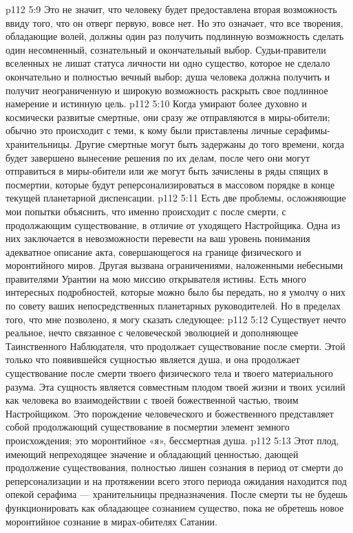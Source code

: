 \vs p112 5:9 Это не значит, что человеку будет предоставлена вторая возможность ввиду того, что он отверг первую, вовсе нет. Но это означает, что все творения, обладающие волей, должны один раз получить подлинную возможность сделать один несомненный, сознательный и окончательный выбор. Судьи\hyp{}правители вселенных не лишат статуса личности ни одно существо, которое не сделало окончательно и полностью вечный выбор; душа человека должна получить и получит неограниченную и широкую возможность раскрыть свое подлинное намерение и истинную цель.
\vs p112 5:10 Когда умирают более духовно и космически развитые смертные, они сразу же отправляются в миры\hyp{}обители; обычно это происходит с теми, к кому были приставлены личные серафимы\hyp{}хранительницы. Другие смертные могут быть задержаны до того времени, когда будет завершено вынесение решения по их делам, после чего они могут отправиться в миры\hyp{}обители или же могут быть зачислены в ряды спящих в посмертии, которые будут реперсонализироваться в массовом порядке в конце текущей планетарной диспенсации.
\vs p112 5:11 \pc Есть две проблемы, осложняющие мои попытки объяснить, что именно происходит с  после смерти, с  продолжающим существование, в отличие от уходящего Настройщика. Одна из них заключается в невозможности перевести на ваш уровень понимания адекватное описание акта, совершающегося на границе физического и моронтийного миров. Другая вызвана ограничениями, наложенными небесными правителями Урантии на мою миссию открывателя истины. Есть много интересных подробностей, которые можно было бы передать, но я умолчу о них по совету ваших непосредственных планетарных руководителей. Но в пределах того, что мне позволено, я могу сказать следующее:
\vs p112 5:12 Существует нечто реальное, нечто связанное с человеческой эволюцией и дополняющее Таинственного Наблюдателя, что продолжает существование после смерти. Этой только что появившейся сущностью является душа, и она продолжает существование после смерти твоего физического тела и твоего материального разума. Эта сущность является совместным плодом твоей жизни и твоих усилий как человека во взаимодействии с твоей божественной частью, твоим Настройщиком. Это порождение человеческого и божественного представляет собой продолжающий существование в посмертии элемент земного происхождения; это моронтийное «я», бессмертная душа.
\vs p112 5:13 Этот плод, имеющий непреходящее значение и обладающий ценностью, дающей продолжение существования, полностью лишен сознания в период от смерти до реперсонализации и на протяжении всего этого периода ожидания находится под опекой серафима --- хранительницы предназначения. После смерти ты не будешь функционировать как обладающее сознанием существо, пока не обретешь новое моронтийное сознание в мирах\hyp{}обителях Сатании.
